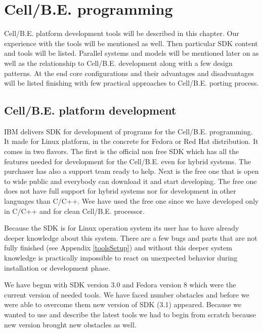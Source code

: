 \chapter {Cell/B.E. programming}
\par
Cell/B.E. platform development tools will be described in this chapter.
Our experience with the tools will be mentioned as well.
Then particular SDK content and tools will be listed.
Parallel systems and models will be mentioned later on as well as the relationship to Cell/B.E. development along with a few design patterns.
At the end core configurations and their advantages and disadvantages will be listed finishing with few practical approaches to Cell/B.E. porting process.

\section{Cell/B.E. platform development}
\par
IBM delivers SDK for development of programs for the Cell/B.E. programming.
It made for Linux platform, in the concrete for Fedora or Red Hat distribution.
It comes in two flavors.
The first is the official non free SDK which has all the features needed for development for the Cell/B.E. even for hybrid systems.
The purchaser has also a support team ready to help.
Next is the free one that is open to wide public and everybody can download it and start developing.
The free one does not have full support for hybrid systems nor for development in other languages than C/C++.
Wee have used the free one since we have developed only in C/C++ and for clean Cell/B.E. processor.

\par
Because the SDK is for Linux operation system its user has to have already deeper knowledge about this system.
There are a few bugs and parts that are not fully finished (see Appendix \ref{toolsSetup}) and without this deeper system knowledge is practically impossible to react on unexpected behavior during installation or development phase.

\par
We have begun with SDK version 3.0 and Fedora version 8 which were the current version of needed tools.
We have faced number obstacles and before we were able to overcome them new version of SDK (3.1) appeared.
Because we wanted to use and describe the latest tools we had to begin from scratch because new version brought new obstacles as well.

